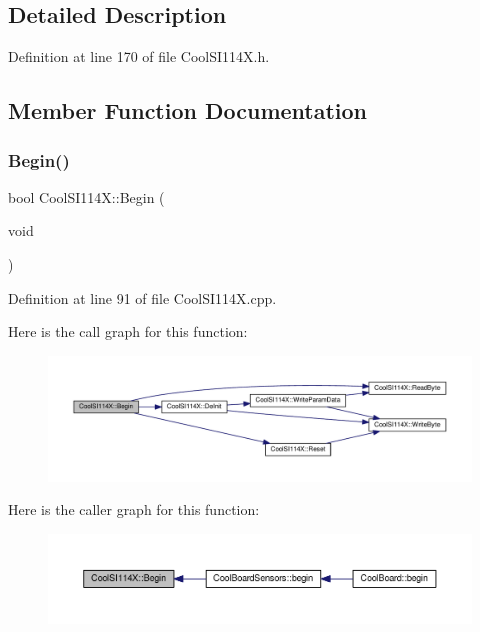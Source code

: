 \subsection{Detailed Description}


Definition at line 170 of file Cool\+S\+I114\+X.\+h.



\subsection{Member Function Documentation}
\mbox{\label{class_cool_s_i114_x_a206b36aca7049f63be1d11088c30a09f}} 
\subsubsection{\texorpdfstring{Begin()}{Begin()}}
{\footnotesize\ttfamily bool Cool\+S\+I114\+X\+::\+Begin (\begin{DoxyParamCaption}\item[{void}]{ }\end{DoxyParamCaption})}



Definition at line 91 of file Cool\+S\+I114\+X.\+cpp.

Here is the call graph for this function\+:
\nopagebreak
\begin{figure}[H]
\begin{center}
\leavevmode
\includegraphics[width=350pt]{class_cool_s_i114_x_a206b36aca7049f63be1d11088c30a09f_cgraph}
\end{center}
\end{figure}
Here is the caller graph for this function\+:
\nopagebreak
\begin{figure}[H]
\begin{center}
\leavevmode
\includegraphics[width=350pt]{class_cool_s_i114_x_a206b36aca7049f63be1d11088c30a09f_icgraph}
\end{center}
\end{figure}
\mbox{\label{class_cool_s_i114_x_a6840abd53a2e3d71a6bb918077c6d6e6}} 
